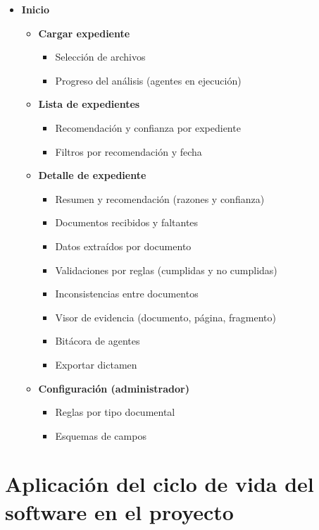 \documentclass[11pt, a4paper]{article}
\begin{document}
\begin{itemize}
    \item \textbf{Inicio}
    \begin{itemize}
        \item \textbf{Cargar expediente}
        \begin{itemize}
            \item Selección de archivos
            \item Progreso del análisis (agentes en ejecución)
        \end{itemize}
        \item \textbf{Lista de expedientes}
        \begin{itemize}
            \item Recomendación y confianza por expediente
            \item Filtros por recomendación y fecha
        \end{itemize}
        \item \textbf{Detalle de expediente}
        \begin{itemize}
            \item Resumen y recomendación (razones y confianza)
            \item Documentos recibidos y faltantes
            \item Datos extraídos por documento
            \item Validaciones por reglas (cumplidas y no cumplidas)
            \item Inconsistencias entre documentos
            \item Visor de evidencia (documento, página, fragmento)
            \item Bitácora de agentes
            \item Exportar dictamen
        \end{itemize}
        \item \textbf{Configuración (administrador)}
        \begin{itemize}
            \item Reglas por tipo documental
            \item Esquemas de campos
        \end{itemize}
    \end{itemize}
\end{itemize}

\section{Aplicación del ciclo de vida del software en el proyecto}
\end{document}
